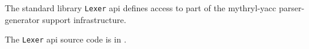 
The standard library {\tt Lexer} api defines access to part of the mythryl-yacc parser-generator support infrastructure.

The {\tt Lexer} api source code is in .






